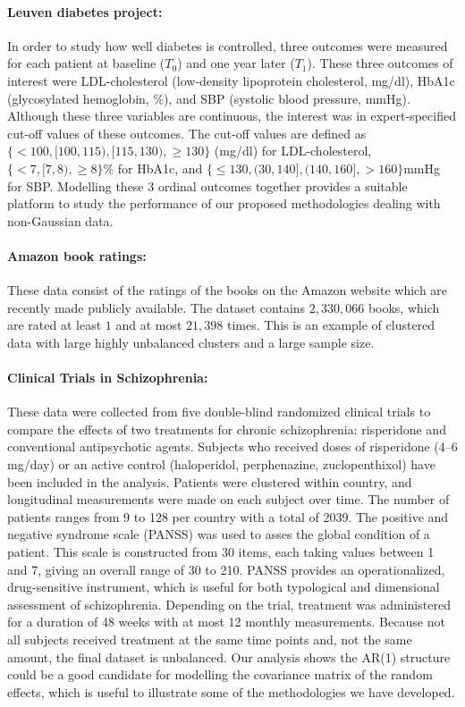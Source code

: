 \documentclass[14pt]{article}
\begin{document}
\paragraph{Leuven diabetes project:} In order to study how well diabetes is controlled, three outcomes were measured for each patient at baseline ($T_0$) and one year later ($T_1$). These three outcomes of interest were LDL-cholesterol (low-density lipoprotein cholesterol, mg/dl), HbA1c (glycosylated hemoglobin, \%), and SBP (systolic blood pressure, mmHg). Although these three variables are continuous, the interest was in expert-specified cut-off values of these outcomes. The cut-off values are defined as $\{<100, [100,115), [115, 130),\geq 130 \}$ (mg/dl) for LDL-cholesterol, $\{<7, [7, 8), \geq 8\}\%$ for HbA1c, and $\{ \leq 130, (30,140],(140,160],>160\}$mmHg for SBP. Modelling these 3 ordinal outcomes together provides a suitable platform to study the performance of our proposed methodologies dealing with non-Gaussian data.

\paragraph*{Amazon book ratings:} These data consist of the ratings of the books on the Amazon website which are recently made publicly available. The dataset contains $2,330,066$ books, which are rated at least $1$ and at most $21,398$ times. This is an example of clustered data with large highly unbalanced clusters and a large sample size.

\paragraph*{Clinical Trials in Schizophrenia:} These data were collected from five double-blind randomized clinical trials to compare the effects of two treatments for chronic schizophrenia: risperidone and conventional antipsychotic agents. Subjects who received doses of risperidone (4–6 mg/day) or an active control (haloperidol, perphenazine, zuclopenthixol) have been included in the analysis. Patients were clustered within country, and longitudinal measurements were made on each subject over time. The number of patients ranges from 9 to 128 per country with a total of 2039. The
positive and negative syndrome scale (PANSS) was used to asses the global condition of a patient. This scale is constructed from 30 items, each taking values between 1 and 7, giving an overall range of 30 to 210. PANSS provides an operationalized, drug-sensitive instrument, which is useful for both typological and dimensional assessment of schizophrenia. Depending on the trial, treatment was administered for a duration of 48 weeks with at most 12 monthly measurements. Because not all subjects received treatment at the same time points and, not the same amount, the final dataset is unbalanced. Our analysis shows the AR(1) structure could be a good candidate for modelling the covariance matrix of the random effects, which is useful to illustrate some of the methodologies we have developed.
\end{document}
